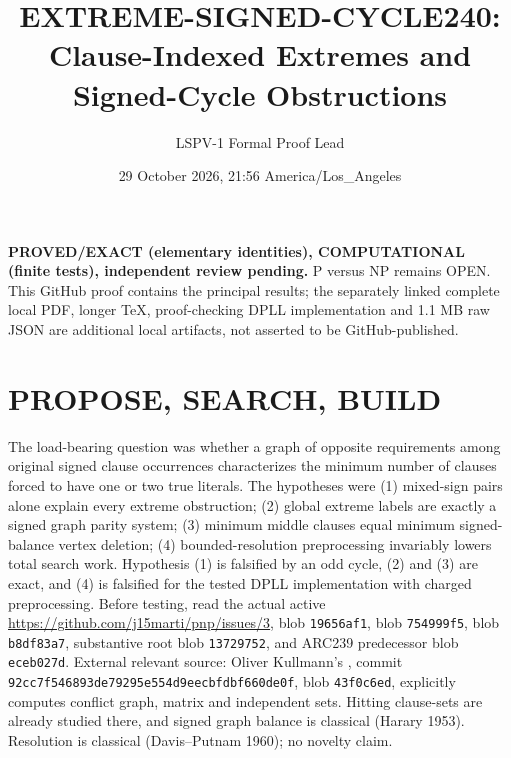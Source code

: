 \documentclass[10pt]{article}
\title{EXTREME-SIGNED-CYCLE240: Clause-Indexed Extremes and Signed-Cycle Obstructions}
\author{LSPV-1 Formal Proof Lead}\date{29 October 2026, 21:56 America/Los\_Angeles}
\begin{document}
\maketitle
\noindent\textbf{PROVED/EXACT (elementary identities), COMPUTATIONAL (finite tests), independent review pending.} P versus NP remains OPEN. This GitHub proof contains the principal results; the separately linked complete local PDF, longer TeX, proof-checking DPLL implementation and 1.1 MB raw JSON are additional local artifacts, not asserted to be GitHub-published.
\section{PROPOSE, SEARCH, BUILD}
The load-bearing question was whether a graph of opposite requirements among original signed clause occurrences characterizes the minimum number of clauses forced to have one or two true literals. The hypotheses were (1) mixed-sign pairs alone explain every extreme obstruction; (2) global extreme labels are exactly a signed graph parity system; (3) minimum middle clauses equal minimum signed-balance vertex deletion; (4) bounded-resolution preprocessing invariably lowers total search work.
Hypothesis (1) is falsified by an odd cycle, (2) and (3) are exact, and (4) is falsified for the tested DPLL implementation with charged preprocessing.
Before testing, read the actual active \url{https://github.com/j15marti/pnp/issues/3},  blob \texttt{19656af1},  blob \texttt{754999f5},  blob \texttt{b8df83a7}, substantive root  blob \texttt{13729752}, and ARC239 predecessor blob \texttt{eceb027d}. External relevant source: Oliver Kullmann's , commit \texttt{92cc7f546893de79295e554d9eecbfdbf660de0f}, blob \texttt{43f0c6ed}, explicitly computes conflict graph, matrix and independent sets. Hitting clause-sets are already studied there, and signed graph balance is classical (Harary 1953). Resolution is classical (Davis--Putnam 1960); no novelty claim.
\end{document}
